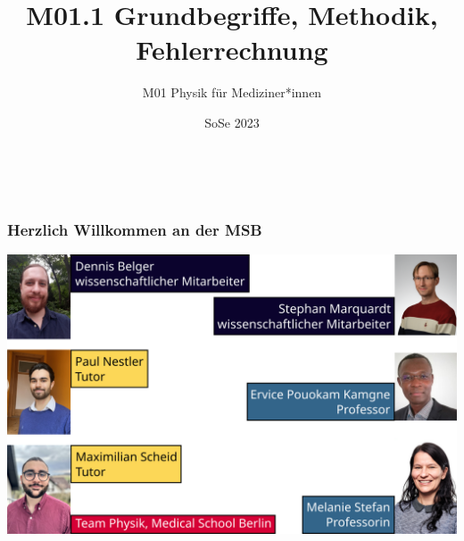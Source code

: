 \documentclass{beamer}
\title[M01.1 Grundbegriffe]{M01.1 Grundbegriffe, Methodik, Fehlerrechnung}
\author[melanie.stefan@medicalschool-berlin.de]{M01 Physik für Mediziner*innen}
\institute[]{Prof. Melanie Stefan - melanie.stefan@medicalschool-berlin.de}
\date{SoSe 2023}
\begin{document}
 
 
 
{  
\begin{frame}

 \maketitle 

$\,$\\[6cm] 


\end{frame} 
}


\begin{frame}
\frametitle{Herzlich Willkommen an der MSB}


\begin{center}
    \includegraphics[width=\textwidth]{team_physik_sose23.png}
\end{center}

\end{frame}
\end{document}

